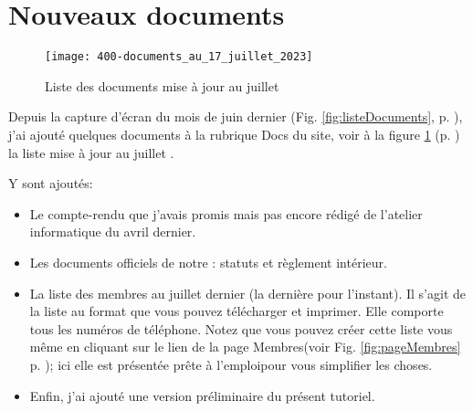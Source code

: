 \section{Nouveaux documents}
\label{sec:nouveauxDocuments}

\begin{figure}
    \centering
    \texttt{[image: 400-documents\_au\_17\_juillet\_2023]}
    \caption{Liste des documents mise à jour au  juillet }
    \label{fig:nouveauxDocuments}
\end{figure}

Depuis la capture d'écran du mois de juin dernier (Fig. \ref{fig:listeDocuments}, p. \pageref{fig:listeDocuments}), j'ai ajouté quelques documents à la rubrique \og Docs \fg du site, voir à la figure \ref{fig:nouveauxDocuments} (p. \pageref{fig:nouveauxDocuments}) la liste mise à jour au  juillet .

Y sont ajoutés:
\begin{itemize}
    \item Le compte-rendu que j'avais promis mais pas encore rédigé de l'atelier informatique du  avril dernier.
    \item Les documents officiels de notre \sel: statuts et règlement intérieur.
    \item La liste des membres au  juillet dernier (la dernière pour l'instant). Il s'agit de la liste au format  que vous pouvez télécharger et imprimer. Elle comporte tous les numéros de téléphone. Notez que vous pouvez créer cette liste vous même en cliquant sur le lien  de la page \og Membres\fg (voir Fig. \ref{fig:pageMembres} p. \pageref{fig:pageMembres}); ici elle est présentée \og prête à l'emploi\fg pour vous simplifier les choses.
    \item Enfin, j'ai ajouté une version préliminaire du présent tutoriel.
\end{itemize}
